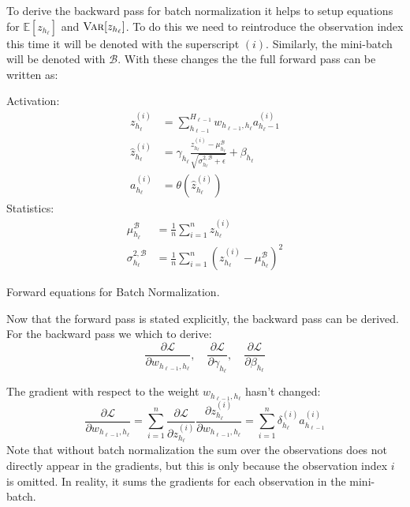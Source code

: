 To derive the backward pass for batch normalization it helps to setup equations for $\mathbb{E}[z_{h_\ell}]$ and $\textsc{Var}[z_{h_\ell}]$. To do this we need to reintroduce the observation index this time it will be denoted with the superscript $(i)$. Similarly, the mini-batch will be denoted with $\mathcal{B}$. With these changes the the full forward pass can be written as:
\begin{equationbox}[H]
Activation:
\begin{equation*}
\begin{aligned}
z_{h_\ell}^{(i)} &= \sum_{h_{\ell-1}}^{H_{\ell-1}} w_{h_{\ell-1},h_\ell} a_{h_\ell-1}^{(i)} \\
\hat{z}_{h_\ell}^{(i)} &= \gamma_{h_\ell} \frac{z_{h_\ell}^{(i)} - \mu_{h_\ell}^{\mathcal{B}}}{\sqrt{\sigma_{h_\ell}^{2,\mathcal{B}} + \epsilon}} + \beta_{h_\ell} \\
a_{h_\ell}^{(i)} &= \theta\left(\hat{z}_{h_\ell}^{(i)}\right)
\end{aligned}
\end{equation*}
Statistics:
\begin{equation*}
\begin{aligned}
\mu_{h_\ell}^{\mathcal{B}} &= \frac{1}{n} \sum_{i=1}^n z_{h_\ell}^{(i)} \\
\sigma_{h_\ell}^{2, \mathcal{B}} &= \frac{1}{n} \sum_{i=1}^n (z_{h_\ell}^{(i)} - \mu_{h_\ell}^{\mathcal{B}})^2
\end{aligned}
\end{equation*}
\caption{Forward equations for Batch Normalization.}
\end{equationbox}

Now that the forward pass is stated explicitly, the backward pass can be derived. For the backward pass we which to derive:
\begin{equation}
\frac{\partial \mathcal{L}}{\partial w_{h_{\ell-1},h_\ell}},\quad \frac{\partial \mathcal{L}}{\partial \gamma_{h_\ell}},\quad \frac{\partial \mathcal{L}}{\partial \beta_{h_\ell}}
\end{equation}

The gradient with respect to the weight $w_{h_{\ell-1},h_\ell}$ hasn't changed:
\begin{equation}
\frac{\partial \mathcal{L}}{\partial w_{h_{\ell-1},h_\ell}} = \sum_{i=1}^n \frac{\partial \mathcal{L}}{\partial z_{h_\ell}^{(i)}} \frac{\partial z_{h_\ell}^{(i)}}{\partial w_{h_{\ell-1},h_\ell}} =\sum_{i=1}^n \delta_{h_\ell}^{(i)} a_{h_{\ell-1}}^{(i)}
\end{equation}
Note that without batch normalization the sum over the observations does not directly appear in the gradients, but this is only because the observation index $i$ is omitted. In reality, it sums the gradients for each observation in the mini-batch.

